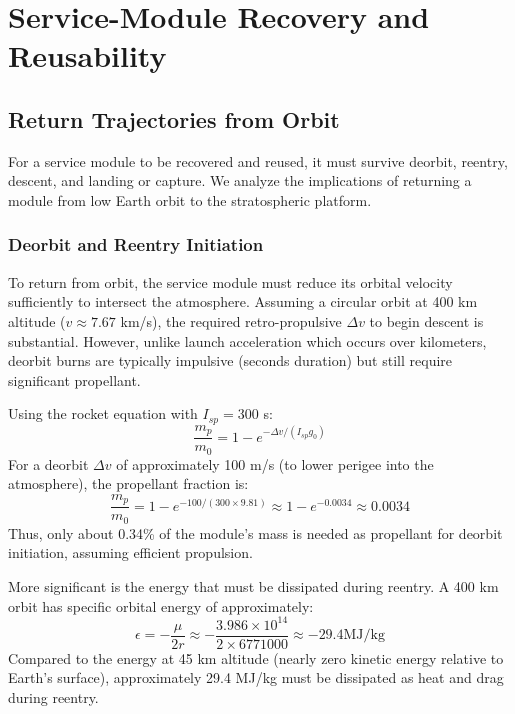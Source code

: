\section{Service-Module Recovery and Reusability}
\label{sec:recovery}

\subsection{Return Trajectories from Orbit}
For a service module to be recovered and reused, it must survive deorbit, reentry, descent, and landing or capture. We analyze the implications of returning a module from low Earth orbit to the stratospheric platform.

\subsubsection{Deorbit and Reentry Initiation}
To return from orbit, the service module must reduce its orbital velocity sufficiently to intersect the atmosphere. Assuming a circular orbit at 400 km altitude ($v \approx 7.67$ km/s), the required retro-propulsive $\Delta v$ to begin descent is substantial. However, unlike launch acceleration which occurs over kilometers, deorbit burns are typically impulsive (seconds duration) but still require significant propellant.

Using the rocket equation with $I_{sp} = 300$ s:
\begin{equation}
\frac{m_p}{m_0} = 1 - e^{-\Delta v / (I_{sp} g_0)}
\end{equation}
For a deorbit $\Delta v$ of approximately 100 m/s (to lower perigee into the atmosphere), the propellant fraction is:
\begin{equation}
\frac{m_p}{m_0} = 1 - e^{-100 / (300 \times 9.81)} \approx 1 - e^{-0.0034} \approx 0.0034
\end{equation}
Thus, only about 0.34\% of the module's mass is needed as propellant for deorbit initiation, assuming efficient propulsion.

More significant is the energy that must be dissipated during reentry. A 400 km orbit has specific orbital energy of approximately:
\begin{equation}
\epsilon = -\frac{\mu}{2r} \approx -\frac{3.986 \times 10^{14}}{2 \times 6771000} \approx -29.4  \text{MJ/kg}
\end{equation}
Compared to the energy at 45 km altitude (nearly zero kinetic energy relative to Earth's surface), approximately 29.4 MJ/kg must be dissipated as heat and drag during reentry.

